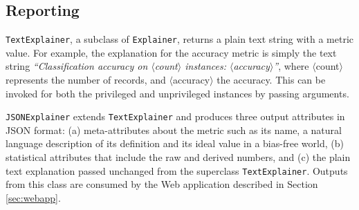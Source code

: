 \documentclass{article}
\begin{document}
\subsection{Reporting}
\label{subsec:explainer:interface}



\texttt{TextExplainer}, a subclass of \texttt{Explainer}, returns a plain text string with a metric value. For example, the explanation for the accuracy metric is simply the text string \textit{``Classification accuracy on $\langle$count$\rangle$ instances: $\langle$accuracy$\rangle$''}, where $\langle$count$\rangle$ represents the number of records, and $\langle$accuracy$\rangle$ the accuracy. This can be invoked for both the privileged and unprivileged instances by passing arguments.

\texttt{JSONExplainer} extends \texttt{TextExplainer} and produces three output attributes in JSON format: (a) meta-attributes about the metric such as its name, a natural language description of its definition and its ideal value in a bias-free world, (b) statistical attributes that include the raw and derived numbers, and (c) the plain text explanation passed unchanged from the superclass \texttt{TextExplainer}. Outputs from this class are consumed by the Web application described in Section \ref{sec:webapp}.
\end{document}
